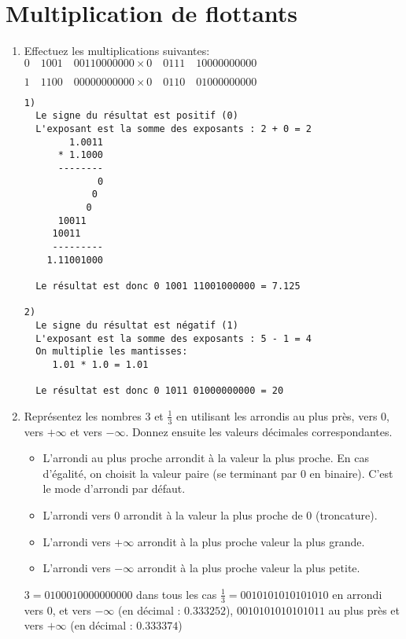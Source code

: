 \documentclass[a4paper,10pt]{exam}
\begin{document}
\section{Multiplication de flottants}
\begin{enumerate}
\item Effectuez les multiplications suivantes:
$0\quad 1001\quad 00110000000 \times 0\quad  0111\quad  10000000000$

$1\quad 1100\quad 00000000000 \times 0\quad  0110\quad  01000000000$
\begin{solution}
\begin{verbatim}
1)
  Le signe du résultat est positif (0)
  L'exposant est la somme des exposants : 2 + 0 = 2
        1.0011
      * 1.1000
      --------
             0
            0
           0
      10011
     10011
     ---------
    1.11001000

  Le résultat est donc 0 1001 11001000000 = 7.125

2)
  Le signe du résultat est négatif (1)
  L'exposant est la somme des exposants : 5 - 1 = 4
  On multiplie les mantisses:
     1.01 * 1.0 = 1.01

  Le résultat est donc 0 1011 01000000000 = 20
\end{verbatim}

\end{solution}

\item Repr\'esentez les nombres $3$ et $\frac{1}{3}$ en utilisant les arrondis
  au plus pr\`es, vers 0, vers $+\infty$ et vers $-\infty$. Donnez ensuite les valeurs d\'ecimales correspondantes.

\begin{solution}
\begin{itemize}
\item L'arrondi au plus proche arrondit \`a la valeur la plus proche. En cas d'\'egalit\'e, on choisit la valeur paire (se terminant par 0 en binaire). C'est le mode d'arrondi par d\'efaut.
\item L'arrondi vers 0 arrondit \`a la valeur la plus proche de 0 (troncature).
\item L'arrondi vers $+\infty$ arrondit \`a la plus proche valeur la plus grande.
\item L'arrondi vers $-\infty$ arrondit \`a la plus proche valeur la plus petite.

\end{itemize}
$3 = 0 1000 10000000000$ dans tous les cas
$\frac{1}{3} = 0 0101 01010101010$ en arrondi vers 0, et vers $-\infty$ (en
d\'ecimal : $0.333252$), $0 0101 01010101011$  au plus pr\`es et vers $+\infty$ (en d\'ecimal : $0.333374$)
\end{solution}


\end{enumerate}
\end{document}
